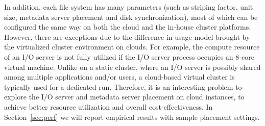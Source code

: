     In addition, each file system has many parameters (such as striping factor,
    unit size, metadata server placement and disk synchronization), most of
    which can be configured the same way on both the cloud and the in-house
    cluster platforms.  However, there are exceptions due to the difference in
    usage model brought by the virtualized cluster environment on clouds.  For
    example, the compute resource of an I/O server is not fully utilized if
    the I/O server process occupies an 8-core virtual machine. Unlike on a
    static cluster, where an I/O server is possibly shared among multiple
    applications and/or users, a cloud-based virtual cluster is typically used
    for a dedicated run.  Therefore, it is an interesting problem to explore
    the I/O server and metadata server placement on cloud instances, to
    achieve better resource utilization and overall cost-effectiveness.  In
    Section~\ref{sec:perf} we will report empirical results with sample
    placement settings.
